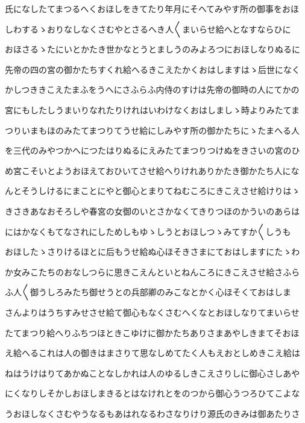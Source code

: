 \documentclass[a4paper,11pt,landscape]{ltjtarticle}
\begin{document}
\par\medskip
氏になしたてまつるへくおほしをきてたり年月にそへてみやす所の御事をおほ
\par\medskip
しわするゝおりなしなくさむやとさるへき人〱まいらせ給へとなすならひに
\par\medskip
おほさるゝたにいとかたき世かなとうとましうのみよろつにおほしなりぬるに
\par\medskip
先帝の四の宮の御かたちすくれ給へるきこえたかくおはしますはゝ后世になく
\par\medskip
かしつききこえたまふをうへにさふらふ内侍のすけは先帝の御時の人にてかの
\par\medskip
宮にもしたしうまいりなれたりけれはいわけなくおはしましゝ時よりみたてま
\par\medskip
つりいまもほのみたてまつりてうせ給にしみやす所の御かたちにゝたまへる人
\par\medskip
を三代のみやつかへにつたはりぬるにえみたてまつりつけぬをきさいの宮のひ
\par\medskip
め宮こそいとようおほえておひいてさせ給へりけれありかたき御かたち人にな
\par\medskip
んとそうしけるにまことにやと御心とまりてねむころにきこえさせ給けりはゝ
\par\medskip
きさきあなおそろしや春宮の女御のいとさかなくてきりつほのかういのあらは
\par\medskip
にはかなくもてなされにしためしもゆゝしうとおほしつゝみてすか〱しうも
\par\medskip
おほしたゝさりけるほとに后もうせ給ぬ心ほそきさまにておはしますにたゝわ
\par\medskip
か女みこたちのおなしつらに思きこえんといとねんころにきこえさせ給さふら
\par\medskip
ふ人〱御うしろみたち御せうとの兵部卿のみこなとかく心ほそくておはしま
\par\medskip
さんよりはうちすみせさせ給て御心もなくさむへくなとおほしなりてまいらせ
\par\medskip
たてまつり給へりふちつほときこゆけに御かたちありさまあやしきまてそおほ
\par\medskip
え給へるこれは人の御きはまさりて思なしめてたく人もえおとしめきこえ給は
\par\medskip
ねはうけはりてあかぬことなしかれは人のゆるしきこえさりしに御心さしあや
\par\medskip
にくなりしそかしおほしまきるとはなけれとをのつから御心うつろひてこよな
\par\medskip
うおほしなくさむやうなるもあはれなるわさなりけり源氏のきみは御あたりさ
\par\medskip
\end{document}
